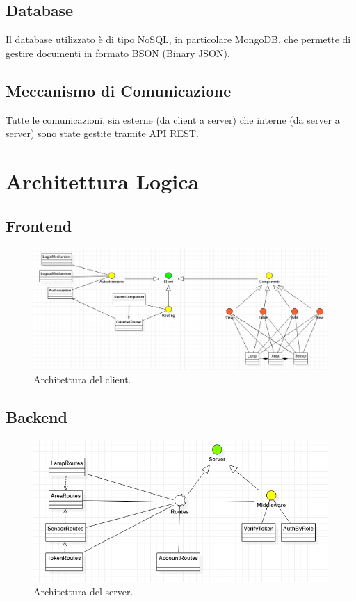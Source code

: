 \documentclass[a4paper, 11pt]{article}
\begin{document}
\subsection{Database}
Il database utilizzato è di tipo NoSQL, in particolare MongoDB, che permette di gestire documenti in formato BSON (Binary JSON).\\

\subsection{Meccanismo di Comunicazione}
Tutte le comunicazioni, sia esterne (da client a server) che interne (da server a server) sono state gestite tramite API REST.\\

\newpage
\section{Architettura Logica}
\subsection{Frontend}
\begin{figure}[H]
    \centering
    \includegraphics[width=\textwidth]{ArchitetturaClient}
    \caption{Architettura del client.}
\end{figure}
\subsection{Backend}
\begin{figure}[H]
    \centering
    \includegraphics[width=\textwidth]{ArchitetturaServer}
    \caption{Architettura del server.}
\end{figure}
\end{document}
